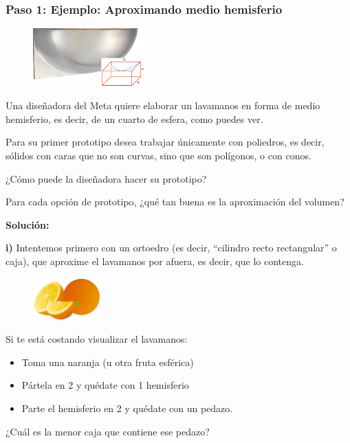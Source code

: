 \documentclass[12pt,a4paper]{article}
\begin{document}
\vspace{4mm}


\subsubsection*{Paso 1: Ejemplo: Aproximando medio hemisferio}

\begin{figure}
\centering
\includegraphics[width=0.38\textwidth]{Figuras/fig29a.png}
\end{figure}

Una diseñadora del Meta quiere elaborar un lavamanos en forma de medio hemisferio, es decir, de un cuarto de esfera, como puedes ver.

Para su primer prototipo desea trabajar únicamente con poliedros, es decir, sólidos con caras que no son curvas, sino que son polígonos, o con conos.

¿Cómo puede la diseñadora hacer su prototipo?

Para cada opción de prototipo, ¿qué tan buena es la aproximación del volumen?

\textbf{Solución:}

\textbf{i)} Intentemos primero con un ortoedro (es decir, ``cilindro recto rectangular'' o caja), que aproxime el lavamanos por afuera, es decir, que lo contenga.

\begin{tcolorbox}[colback=fondoverde, colframe=verdeclaro]
\begin{figure}
\centering
\vspace{-10pt}
\includegraphics[width=0.23\textwidth]{Figuras/fig29b.png}
\vspace{-10pt}
\end{figure}

Si te está costando visualizar el lavamanos:
\begin{itemize}[nosep]
    \item Toma una naranja (u otra fruta esférica)
    \item Pártela en 2 y quédate con 1 hemisferio
    \item Parte el hemisferio en 2 y quédate con un pedazo.
\end{itemize}

¿Cuál es la menor caja que contiene ese pedazo?
\end{tcolorbox}
\end{document}
